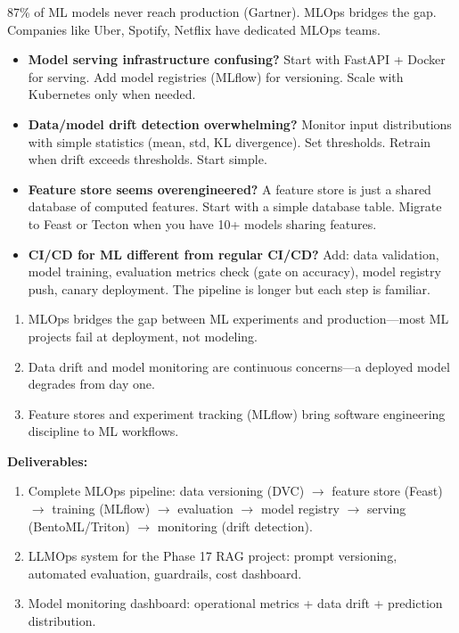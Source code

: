 \documentclass[11pt, a4paper, oneside]{report}
\newcommand{\arrow}{$\rightarrow$}
\begin{document}
\begin{realworldbox}
87\% of ML models never reach production (Gartner). MLOps bridges the gap. Companies like Uber, Spotify, Netflix have dedicated MLOps teams.
\end{realworldbox}


\begin{stuckbox}
\begin{itemize}[leftmargin=*]
\item \textbf{Model serving infrastructure confusing?} Start with FastAPI + Docker for serving. Add model registries (MLflow) for versioning. Scale with Kubernetes only when needed.
\item \textbf{Data/model drift detection overwhelming?} Monitor input distributions with simple statistics (mean, std, KL divergence). Set thresholds. Retrain when drift exceeds thresholds. Start simple.
\item \textbf{Feature store seems overengineered?} A feature store is just a shared database of computed features. Start with a simple database table. Migrate to Feast or Tecton when you have 10+ models sharing features.
\item \textbf{CI/CD for ML different from regular CI/CD?} Add: data validation, model training, evaluation metrics check (gate on accuracy), model registry push, canary deployment. The pipeline is longer but each step is familiar.
\end{itemize}
\end{stuckbox}


\begin{takeawaybox}
\begin{enumerate}[leftmargin=*]
\item MLOps bridges the gap between ML experiments and production---most ML projects fail at deployment, not modeling.
\item Data drift and model monitoring are continuous concerns---a deployed model degrades from day one.
\item Feature stores and experiment tracking (MLflow) bring software engineering discipline to ML workflows.
\end{enumerate}
\end{takeawaybox}

\begin{milestonebox}
\textbf{Deliverables:}
\begin{enumerate}[leftmargin=*]
\item Complete MLOps pipeline: data versioning (DVC) \arrow{} feature store (Feast) \arrow{} training (MLflow) \arrow{} evaluation \arrow{} model registry \arrow{} serving (BentoML/Triton) \arrow{} monitoring (drift detection).
\item LLMOps system for the Phase 17 RAG project: prompt versioning, automated evaluation, guardrails, cost dashboard.
\item Model monitoring dashboard: operational metrics + data drift + prediction distribution.
\end{enumerate}
\end{milestonebox}
\end{document}
